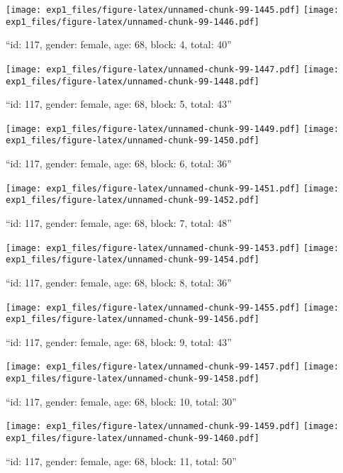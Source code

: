 \documentclass[,]{article}
\begin{document}
\texttt{[image: exp1\_files/figure-latex/unnamed-chunk-99-1445.pdf]}
\texttt{[image: exp1\_files/figure-latex/unnamed-chunk-99-1446.pdf]}

\newpage
[1] 

``id: 117, gender: female, age: 68, block: 4, total: 40''

\texttt{[image: exp1\_files/figure-latex/unnamed-chunk-99-1447.pdf]}
\texttt{[image: exp1\_files/figure-latex/unnamed-chunk-99-1448.pdf]}

\newpage
[1] 

``id: 117, gender: female, age: 68, block: 5, total: 43''

\texttt{[image: exp1\_files/figure-latex/unnamed-chunk-99-1449.pdf]}
\texttt{[image: exp1\_files/figure-latex/unnamed-chunk-99-1450.pdf]}

\newpage
[1] 

``id: 117, gender: female, age: 68, block: 6, total: 36''

\texttt{[image: exp1\_files/figure-latex/unnamed-chunk-99-1451.pdf]}
\texttt{[image: exp1\_files/figure-latex/unnamed-chunk-99-1452.pdf]}

\newpage
[1] 

``id: 117, gender: female, age: 68, block: 7, total: 48''

\texttt{[image: exp1\_files/figure-latex/unnamed-chunk-99-1453.pdf]}
\texttt{[image: exp1\_files/figure-latex/unnamed-chunk-99-1454.pdf]}

\newpage
[1] 

``id: 117, gender: female, age: 68, block: 8, total: 36''

\texttt{[image: exp1\_files/figure-latex/unnamed-chunk-99-1455.pdf]}
\texttt{[image: exp1\_files/figure-latex/unnamed-chunk-99-1456.pdf]}

\newpage
[1] 

``id: 117, gender: female, age: 68, block: 9, total: 43''

\texttt{[image: exp1\_files/figure-latex/unnamed-chunk-99-1457.pdf]}
\texttt{[image: exp1\_files/figure-latex/unnamed-chunk-99-1458.pdf]}

\newpage
[1] 

``id: 117, gender: female, age: 68, block: 10, total: 30''

\texttt{[image: exp1\_files/figure-latex/unnamed-chunk-99-1459.pdf]}
\texttt{[image: exp1\_files/figure-latex/unnamed-chunk-99-1460.pdf]}

\newpage
[1] 

``id: 117, gender: female, age: 68, block: 11, total: 50''
\end{document}
